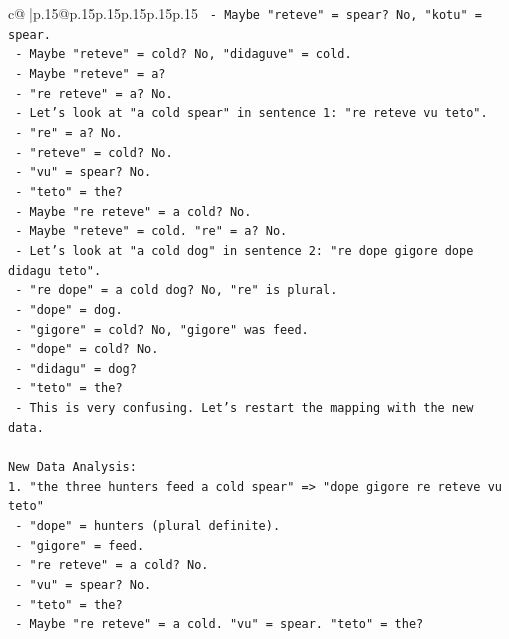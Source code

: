 \documentclass{article}
\begin{document}
{\begin{supertabular}{c@{$\;$}|p{.15\linewidth}@{}p{.15\linewidth}p{.15\linewidth}p{.15\linewidth}p{.15\linewidth}p{.15\linewidth}}
{{{\texttt{           {-} Maybe "reteve" = spear? No, "kotu" = spear.} \\
\texttt{           {-} Maybe "reteve" = cold? No, "didaguve" = cold.} \\
\texttt{           {-} Maybe "reteve" = a?} \\
\texttt{           {-} "re reteve" = a? No.} \\
\texttt{           {-} Let's look at "a cold spear" in sentence 1: "re reteve vu teto".} \\
\texttt{             {-} "re" = a? No.} \\
\texttt{             {-} "reteve" = cold? No.} \\
\texttt{             {-} "vu" = spear? No.} \\
\texttt{             {-} "teto" = the?} \\
\texttt{             {-} Maybe "re reteve" = a cold? No.} \\
\texttt{             {-} Maybe "reteve" = cold. "re" = a? No.} \\
\texttt{             {-} Let's look at "a cold dog" in sentence 2: "re dope gigore dope didagu teto".} \\
\texttt{               {-} "re dope" = a cold dog? No, "re" is plural.} \\
\texttt{               {-} "dope" = dog.} \\
\texttt{               {-} "gigore" = cold? No, "gigore" was feed.} \\
\texttt{               {-} "dope" = cold? No.} \\
\texttt{               {-} "didagu" = dog?} \\
\texttt{               {-} "teto" = the?} \\
\texttt{               {-} This is very confusing. Let's restart the mapping with the new data.} \\
\\ 
\texttt{New Data Analysis:} \\
\texttt{1. "the three hunters feed a cold spear" => "dope gigore re reteve vu teto"} \\
\texttt{   {-} "dope" = hunters (plural definite).} \\
\texttt{   {-} "gigore" = feed.} \\
\texttt{   {-} "re reteve" = a cold? No.} \\
\texttt{   {-} "vu" = spear? No.} \\
\texttt{   {-} "teto" = the?} \\
\texttt{   {-} Maybe "re reteve" = a cold. "vu" = spear. "teto" = the?} \\
}}}
\end{supertabular}}
\end{document}
